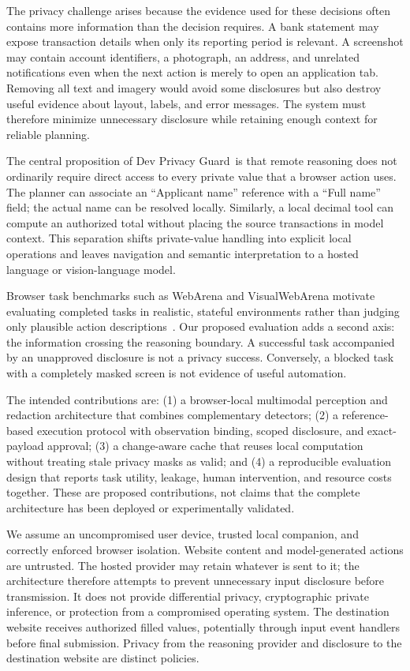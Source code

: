 \documentclass[conference]{IEEEtran}
\newcommand{\sys}{Dev Privacy Guard}
\begin{document}
The privacy challenge arises because the evidence used for these decisions often contains more information than the decision requires. A bank statement may expose transaction details when only its reporting period is relevant. A screenshot may contain account identifiers, a photograph, an address, and unrelated notifications even when the next action is merely to open an application tab. Removing all text and imagery would avoid some disclosures but also destroy useful evidence about layout, labels, and error messages. The system must therefore minimize unnecessary disclosure while retaining enough context for reliable planning.

The central proposition of \sys\ is that remote reasoning does not ordinarily require direct access to every private value that a browser action uses. The planner can associate an ``Applicant name'' reference with a ``Full name'' field; the actual name can be resolved locally. Similarly, a local decimal tool can compute an authorized total without placing the source transactions in model context. This separation shifts private-value handling into explicit local operations and leaves navigation and semantic interpretation to a hosted language or vision-language model.

Browser task benchmarks such as WebArena and VisualWebArena motivate evaluating completed tasks in realistic, stateful environments rather than judging only plausible action descriptions~\cite{webarena,visualwebarena}. Our proposed evaluation adds a second axis: the information crossing the reasoning boundary. A successful task accompanied by an unapproved disclosure is not a privacy success. Conversely, a blocked task with a completely masked screen is not evidence of useful automation.

The intended contributions are: (1) a browser-local multimodal perception and redaction architecture that combines complementary detectors; (2) a reference-based execution protocol with observation binding, scoped disclosure, and exact-payload approval; (3) a change-aware cache that reuses local computation without treating stale privacy masks as valid; and (4) a reproducible evaluation design that reports task utility, leakage, human intervention, and resource costs together. These are proposed contributions, not claims that the complete architecture has been deployed or experimentally validated.

We assume an uncompromised user device, trusted local companion, and correctly enforced browser isolation. Website content and model-generated actions are untrusted. The hosted provider may retain whatever is sent to it; the architecture therefore attempts to prevent unnecessary input disclosure before transmission. It does not provide differential privacy, cryptographic private inference, or protection from a compromised operating system. The destination website receives authorized filled values, potentially through input event handlers before final submission. Privacy from the reasoning provider and disclosure to the destination website are distinct policies.
\end{document}
